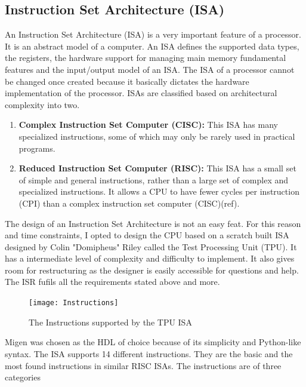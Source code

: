\subsection{Instruction Set Architecture (ISA)}
An Instruction Set Architecture (ISA) is a very important feature of a processor. It is an abstract model of a computer. An ISA defines the supported data types, the registers, the hardware support for managing main memory fundamental features and the input/output model of an ISA. The ISA of a processor cannot be changed once created because it basically dictates the hardware implementation of the processor.
ISAs are classified based on architectural complexity into two.
\begin{enumerate}
\item \textbf{Complex Instruction Set Computer (CISC):} This ISA has many specialized instructions, some of which may only be rarely used in practical programs.
\item \textbf{Reduced Instruction Set Computer (RISC):} This ISA has a small set of simple and general instructions, rather than a large set of complex and specialized instructions. It allows a CPU to have fewer cycles per instruction (CPI) than a complex instruction set computer (CISC)(ref).
\end{enumerate}

The design of an Instruction Set Architecture is not an easy feat. For this reason and time constraints, I opted to design the CPU based on a scratch built ISA designed by Colin "Domipheus" Riley called the Test Processing Unit (TPU). It has a intermediate level of complexity and difficulty to  implement. It also gives room for restructuring as the designer is easily accessible for questions and help. The ISR fufils all the requirements stated above and more.

\begin{figure}[p]
\texttt{[image: Instructions]}
\centering
\caption{The Instructions supported by the TPU ISA}
\centering
\label{fig:instr}

\end{figure}


Migen was chosen as the HDL of choice because of its simplicity and Python-like syntax. The ISA supports 14 different instructions. They are the basic and the most found instructions in similar RISC ISAs. The instructions are of three categories 

